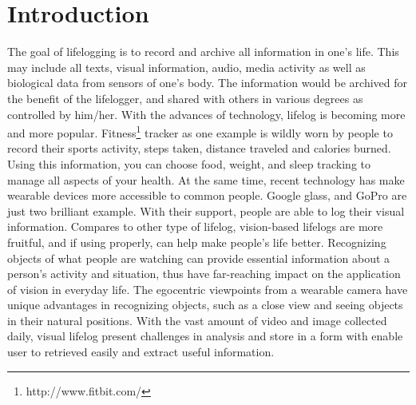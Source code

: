 \section{Introduction}
\label{sec:sec_intro}

The goal of lifelogging is to record and archive all information in one's life. 
This may include all texts, visual information, audio, media activity as well 
as biological data from sensors of one's body. The information would be archived
for the benefit of the lifelogger, and shared with others in various degrees as
controlled by him/her.  With the advances of technology, lifelog is becoming more
 and more popular. Fitness\footnote{http://www.fitbit.com/} tracker as one
 example is wildly worn by people to record  their sports activity, steps taken, distance traveled and calories
 burned.  Using this information, you can choose food, weight, and sleep
 tracking  to manage all aspects of your health.  At the same time, recent 
 technology has make wearable devices more accessible to common people. Google
 glass, and GoPro are just two brilliant example. With their support,  people
 are able to log their visual information.
Compares to other type of lifelog, vision-based lifelogs are more fruitful, and
if using properly, can help make people's life better. Recognizing objects of 
what people are watching can provide essential information about a person's 
activity and situation, thus have far-reaching impact on the application of 
vision in everyday life. The egocentric viewpoints from a wearable camera have
unique advantages in recognizing objects, such as a close view and seeing
objects in their natural positions.
With the vast amount of video and image collected daily, visual lifelog present 
challenges in analysis and store in a form with enable user to retrieved easily 
and extract useful information. 

